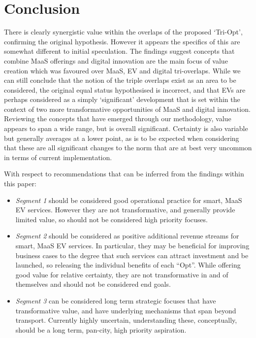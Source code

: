 \documentclass[b5paper,10pt]{article}
\begin{document}
 


\section{Conclusion}\label{conclusion}

There is clearly synergistic value within the overlaps of the proposed
`Tri-Opt', confirming the original hypothesis. However it appears the
specifics of this are somewhat different to initial speculation. The
findings suggest concepts that combine MaaS offerings and digital
innovation are the main focus of value creation which was favoured
over MaaS, EV and digital tri-overlaps. While we can still conclude
that the notion of the triple overlaps exist as an area to be
considered, the original equal status hypothesised is incorrect, and
that EVs are perhaps considered as a simply `significant' development
that is set within the context of two more transformative
opportunities of MaaS and digital innovation. Reviewing the concepts
that have emerged through our methodology, value appears to span a
wide range, but is overall significant. Certainty is also variable but
generally averages at a lower point, as is to be expected when
considering that these are all significant changes to the norm that
are at best very uncommon in terms of current implementation.

With respect to recommendations that can be inferred from the findings
within this paper:

\begin{itemize}
\item {\emph{Segment 1}} should be considered good operational
practice for smart, MaaS EV services. However they are not
transformative, and generally provide limited value, so should not be
considered high priority focuses.
\item {\emph{Segment 2}} should be considered as positive additional
revenue streams for smart, MaaS EV services. In particular, they may
be beneficial for improving business cases to the degree that such
services can attract investment and be launched, so releasing the
individual benefits of each ``Opt''. While offering good value for
relative certainty, they are not transformative in and of themselves
and should not be considered end goals.
\item {\emph{Segment 3}} can be considered long term strategic focuses
that have transformative value, and have underlying mechanisms that
span beyond transport. Currently highly uncertain, understanding
these, conceptually, should be a long term, pan-city, high priority
  aspiration.
\end{itemize}
\end{document}
